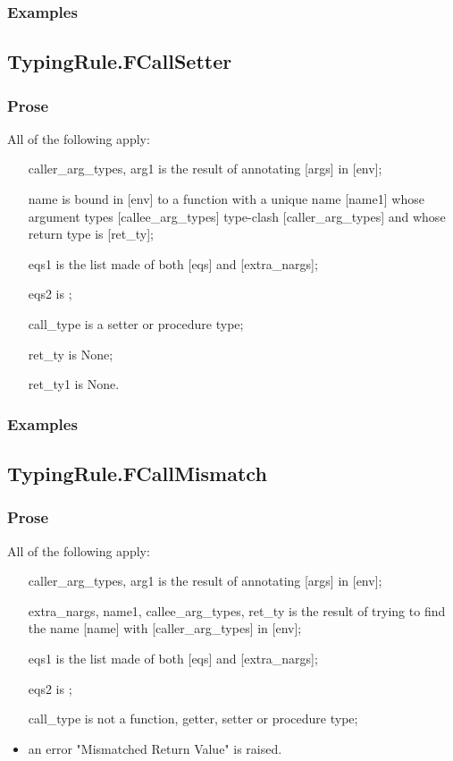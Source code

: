 \documentclass{book}
\begin{document}
    \subsubsection{Examples}

\subsection{TypingRule.FCallSetter}

    \subsubsection{Prose}
    All of the following apply:
   \begin{itemize}
   \item [caller\_arg\_types, arg1] is the result of annotating [args] in [env];
   \item [name] is bound in [env] to a function with a unique name [name1] whose argument types [callee\_arg\_types] type-clash [caller\_arg\_types] and whose return type is [ret\_ty];
   \item [eqs1] is the list made of both [eqs] and [extra\_nargs];
   \item [eqs2] is ;
   \item [call\_type] is a setter or procedure type;
   \item [ret\_ty] is None;
   \item [ret\_ty1] is None.
   \end{itemize}

    \subsubsection{Examples}

\subsection{TypingRule.FCallMismatch}

    \subsubsection{Prose}
    All of the following apply:
   \begin{itemize}
   \item [caller\_arg\_types, arg1] is the result of annotating [args] in [env];
   \item [extra\_nargs, name1, callee\_arg\_types, ret\_ty] is the result of trying to
      find the name [name] with [caller\_arg\_types] in [env];
   \item [eqs1] is the list made of both [eqs] and [extra\_nargs];
   \item [eqs2] is ;
   \item [call\_type] is not a function, getter, setter or procedure type;
   \item an error "Mismatched Return Value" is raised.
   \end{itemize}
\end{document}
